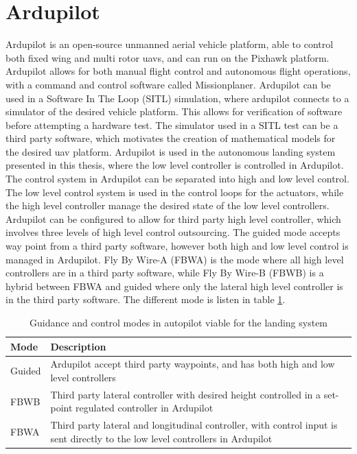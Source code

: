 \section{Ardupilot}\label{ss:ardupilot}
Ardupilot is an open-source unmanned aerial vehicle platform, able to control both fixed wing and multi rotor \glspl{uav}, and can run on the Pixhawk platform. Ardupilot allows for both manual flight control and autonomous flight operations, with a command and control software called Missionplaner. Ardupilot can be used in a Software In The Loop (SITL) simulation, where ardupilot connects to a simulator of the desired vehicle platform. This allows for verification of software before attempting a hardware test. The simulator used in a SITL test can be a third party software, which motivates the creation of mathematical models for the desired \gls{uav} platform. Ardupilot is used in the autonomous landing system presented in this thesis, where the low level controller is controlled in Ardupilot. The control system in Ardupilot can be separated into high and low level control. The low level control system is used in the control loops for the actuators, while the high level controller manage the desired state of the low level controllers. Ardupilot can be configured to allow for third party high level controller, which involves three levels of high level control outsourcing. The guided mode accepts way point from a third party software, however both high and low level control is managed in Ardupilot. Fly By Wire-A (FBWA) is the mode where all high level controllers are in a third party software, while Fly By Wire-B (FBWB) is a hybrid between FBWA and guided where only the lateral high level controller is in the third party software. The different mode is listen in table \ref{tb:ArduPilotMode}.
\begin{table}[H]
\centering
\begin{tabular}{| p{3cm} | p{5cm}|}
\hline
\textbf{Mode}	&	\textbf{Description} \\ \hline
Guided			& Ardupilot accept third party waypoints, and has both high and low level controllers										\\ \hline
FBWB			& Third party lateral controller with desired height controlled in a set-point regulated controller in Ardupilot \\ \hline
FBWA			& Third party lateral and longitudinal controller, with control input is sent directly to the low level controllers in Ardupilot 	\\ \hline
\end{tabular}
\caption{Guidance and control modes in autopilot viable for the landing system}
\label{tb:ArduPilotMode}
\end{table}

